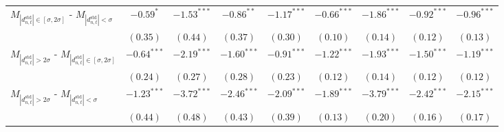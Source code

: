 \begin{tabular}{lcccccccc}
 \hline$M_{|d^\text{std}_{n,t}| \in [\sigma, 2\sigma]}$ - $M_{|d^\text{std}_{n,t}| < \sigma}$ & $-0.59^{*}$ & $-1.53^{***}$ & $-0.86^{**}$ & $-1.17^{***}$ & $-0.66^{***}$ & $-1.86^{***}$ & $-0.92^{***}$ & $-0.96^{***}$ \\ 
   & $(0.35)$ & $(0.44)$ & $(0.37)$ & $(0.30)$ & $(0.10)$ & $(0.14)$ & $(0.12)$ & $(0.13)$ \\ 
  $M_{|d^\text{std}_{n,t}| > 2\sigma}$ - $M_{|d^\text{std}_{n,t}| \in [\sigma, 2\sigma]}$ & $-0.64^{***}$ & $-2.19^{***}$ & $-1.60^{***}$ & $-0.91^{***}$ & $-1.22^{***}$ & $-1.93^{***}$ & $-1.50^{***}$ & $-1.19^{***}$ \\ 
   & $(0.24)$ & $(0.27)$ & $(0.28)$ & $(0.23)$ & $(0.12)$ & $(0.14)$ & $(0.12)$ & $(0.12)$ \\ 
  $M_{|d^\text{std}_{n,t}| > 2\sigma}$ - $M_{|d^\text{std}_{n,t}| < \sigma}$ & $-1.23^{***}$ & $-3.72^{***}$ & $-2.46^{***}$ & $-2.09^{***}$ & $-1.89^{***}$ & $-3.79^{***}$ & $-2.42^{***}$ & $-2.15^{***}$ \\ 
   & $(0.44)$ & $(0.48)$ & $(0.43)$ & $(0.39)$ & $(0.13)$ & $(0.20)$ & $(0.16)$ & $(0.17)$ \\ 
   \hline 
\end{tabular}
